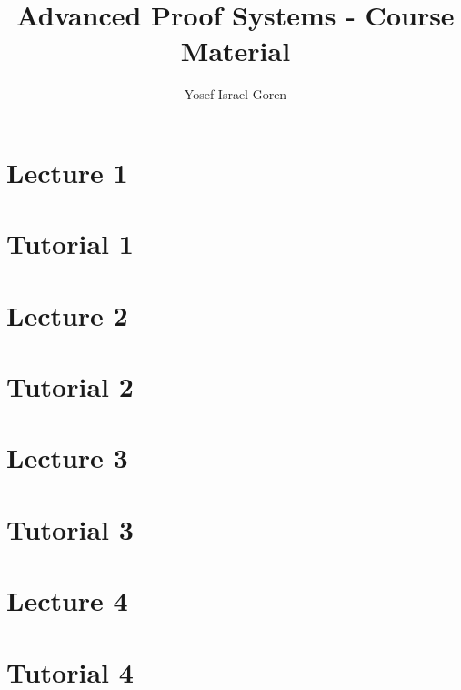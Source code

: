 \documentclass{article}
\title{Advanced Proof Systems - Course Material}
\author{Yosef Israel Goren}
\begin{document}
\maketitle

\part*{Lecture 1}

\part*{Tutorial 1}

\part*{Lecture 2}

\part*{Tutorial 2}

\part*{Lecture 3}

\part*{Tutorial 3}

\part*{Lecture 4}

\part*{Tutorial 4}

\end{document}
